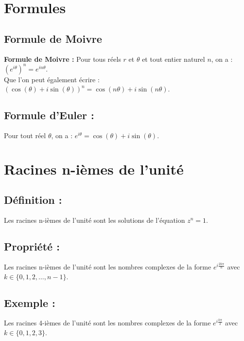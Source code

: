 \documentclass[a4paper,12pt]{article}
\begin{document}
    \begin{center}
    \end{center}

    \section{Formules}
    \subsection{Formule de Moivre}
    \textbf{Formule de Moivre :} Pour tous réels $r$ et $\theta$ et tout entier naturel $n$, on a : $(e^{i\theta})^n = e^{in\theta}$. \\ Que l'on peut également écrire : $(\cos(\theta) + i\sin(\theta))^n = \cos(n\theta) + i\sin(n\theta)$.
    \subsection{Formule d'Euler :} Pour tout réel $\theta$, on a : $e^{i\theta} = \cos(\theta) + i\sin(\theta)$.

    \section{Racines n-ièmes de l'unité}
    \subsection{Définition :} Les racines n-ièmes de l'unité sont les solutions de l'équation $z^n = 1$.
    \subsection{Propriété :} Les racines n-ièmes de l'unité sont les nombres complexes de la forme $e^{i\frac{2k\pi}{n}}$ avec $k \in \{0, 1, 2, \ldots, n-1\}$.
    \subsection{Exemple :} Les racines 4-ièmes de l'unité sont les nombres complexes de la forme $e^{i\frac{k\pi}{2}}$ avec $k \in \{0, 1, 2, 3\}$.
\end{document}
